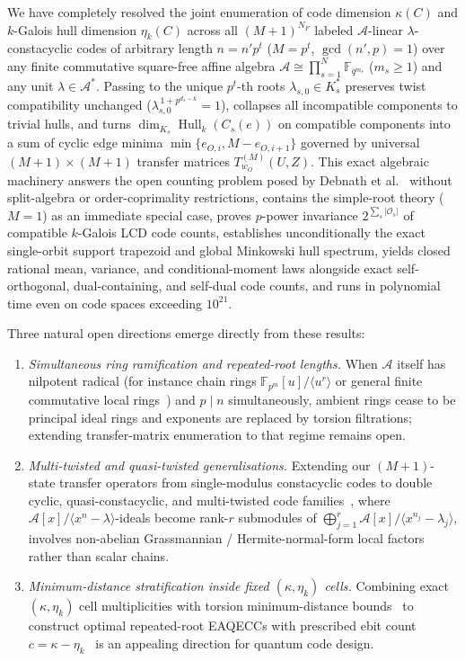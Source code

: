 \documentclass[preprint,12pt]{elsarticle}
\newcommand{\F}{\mathbb F}
\newcommand{\A}{\mathcal A}
\newcommand{\Os}{\mathcal O_s}
\newcommand{\Hull}{\operatorname{Hull}}
\numberwithin{equation}{section}
\theoremstyle{plain}
\theoremstyle{definition}
\theoremstyle{remark}
\begin{document}
We have completely resolved the joint enumeration of code dimension $\kappa(C)$
and $k$-Galois hull dimension $\eta_k(C)$ across all $(M+1)^{N_F}$ labeled
$\A$-linear $\lambda$-constacyclic codes of arbitrary length $n=n'p^t$ ($M=p^t$,
$\gcd(n',p)=1$) over any finite commutative square-free affine algebra
$\A\cong\prod_{s=1}^{N}\F_{q^{m_s}}$ ($m_s\ge 1$) and any unit $\lambda\in\A^*$.
Passing to the unique $p^t$-th roots $\lambda_{s,0}\in K_s^*$ preserves twist
compatibility unchanged ($\lambda_{s,0}^{\,1+p^{d_s-k}}=1$), collapses all
incompatible components to trivial hulls, and turns $\dim_{K_s}\Hull_k(C_s(e))$ on
compatible components into a sum of cyclic edge minima $\min\{e_{O,i},M-e_{O,i+1}\}$
governed by universal $(M+1)\times(M+1)$ transfer matrices $T_{w_O}^{(M)}(U,Z)$.
This exact algebraic machinery answers the open counting problem posed by
Debnath et al.~\cite[p.~23]{debnathAffine2026} without split-algebra or
order-coprimality restrictions, contains the simple-root theory ($M=1$) as an
immediate special case, proves $p$-power invariance $2^{\sum_s|\Os|}$ of compatible $k$-Galois
LCD code counts, establishes unconditionally the exact single-orbit support
trapezoid and global Minkowski hull spectrum, yields closed rational mean,
variance, and conditional-moment laws alongside exact self-orthogonal,
dual-containing, and self-dual code counts, and runs in polynomial time even on
code spaces exceeding $10^{21}$.

Three natural open directions emerge directly from these results:
\begin{enumerate}
\item \emph{Simultaneous ring ramification and repeated-root lengths.} When $\A$
itself has nilpotent radical (for instance chain rings $\F_{p^m}[u]/\langle u^r\rangle$
or general finite commutative local rings~\cite{nortonSalagean2000,dinhLopezPermouth2004,jitmanZ4,talbi2022,pathakZ4,zhang2026})
and $p\mid n$ simultaneously, ambient rings cease to be principal ideal rings and
exponents are replaced by torsion filtrations; extending transfer-matrix
enumeration to that regime remains open.
\item \emph{Multi-twisted and quasi-twisted generalisations.} Extending our
$(M+1)$-state transfer operators from single-modulus constacyclic codes to
double cyclic, quasi-constacyclic, and multi-twisted code families~\cite{gao2023,eldinSole2026,eldinLeroy2026,aliabadi2026},
where $\A[x]/\langle x^n-\lambda\rangle$-ideals become rank-$r$ submodules of
$\bigoplus_{j=1}^{r}\A[x]/\langle x^{n_j}-\lambda_j\rangle$, involves non-abelian
Grassmannian / Hermite-normal-form local factors rather than scalar chains.
\item \emph{Minimum-distance stratification inside fixed $(\kappa,\eta_k)$ cells.}
Combining exact $(\kappa,\eta_k)$ cell multiplicities with torsion minimum-distance
bounds~\cite{castagnoli1991,nortonSalagean2000} to construct optimal repeated-root
EAQECCs with prescribed ebit count $c=\kappa-\eta_k$~\cite{brun2006,wildeBrun2008,guendaJitmanGulliver2018}
is an appealing direction for quantum code design.
\end{enumerate}
\end{document}
